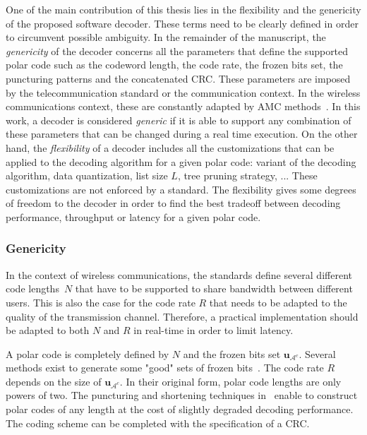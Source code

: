 One of the main contribution of this thesis lies in the flexibility and the
genericity of the proposed software decoder. These terms need to be clearly
defined in order to circumvent possible ambiguity. In the remainder of the
manuscript, the \textit{genericity} of the decoder concerns all the parameters
that define the supported polar code such as the codeword length, the code rate,
the frozen bits set, the puncturing patterns and the concatenated CRC. These
parameters are imposed by the telecommunication standard or the communication
context. In the wireless communications context, these are constantly adapted by
AMC methods~\cite{Dahlman2013}. In this work, a decoder is considered
\textit{generic} if it is able to support any combination of these parameters
that can be changed during a real time execution. On the other hand, the
\textit{flexibility} of a decoder includes all the customizations that can be
applied to the decoding algorithm for a given polar code: variant of the
decoding algorithm, data quantization, list size $L$, tree pruning strategy, ...
These customizations are not enforced by a standard. The flexibility gives some
degrees of freedom to the decoder in order to find the best tradeoff between
decoding performance, throughput or latency for a given polar code.

\subsubsection{Genericity}
\label{sec:alg_polar_genericity}

In the context of wireless communications, the standards define several
different code lengths~$N$ that have to be supported to share bandwidth between
different users. This is also the case for the code rate $R$ that needs to be
adapted to the quality of the transmission channel. Therefore, a practical
implementation should be adapted to both $N$ and $R$ in real-time in order to
limit latency.

A polar code is completely defined by $N$ and the frozen bits set
$\bm{u}_{\mathcal{A}^c}$. Several methods exist to generate some "good" sets of
frozen bits~\cite{Tal2013,Trifonov2012}. The code rate $R$ depends on the size
of $\bm{u}_{\mathcal{A}^c}$. In their original form, polar code lengths are only
powers of two. The puncturing and shortening techniques
in~\cite{Wang2014,Niu2013,Miloslavskaya2015} enable to construct polar codes of
any length at the cost of slightly degraded decoding performance. The coding
scheme can be completed with the specification of a CRC.

